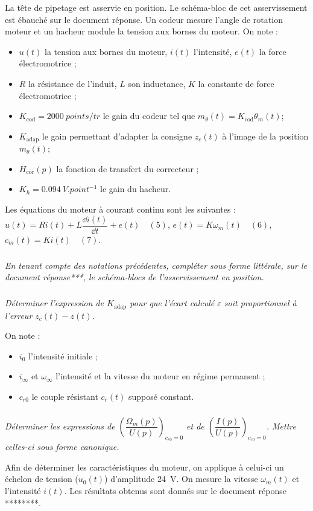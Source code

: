 \documentclass[10pt,fleqn]{article} %
\begin{document}
La tête de pipetage est asservie en position. Le schéma-bloc de cet asservissement est ébauché sur le
document réponse. Un codeur mesure l’angle de rotation moteur et un hacheur
module la tension aux bornes du moteur.
On note :
\begin{itemize}
\item $u(t)$ la tension aux bornes du moteur, $i(t)$ l’intensité, $e(t)$ la force électromotrice ;
\item $R$ la résistance de l’induit, $L$ son inductance, $K$ la constante de force électromotrice ;
\item $K_{\text{cod}} = \SI{2 000}{points/tr}$ le gain du codeur tel que $m_{\theta}(t) = K_{\text{cod}}\theta_m(t)$;
\item $K_\text{adap}$ le gain permettant d’adapter la consigne $z_c(t)$ à l’image de la position $m_{\theta}(t)$;
\item $H_{\text{cor}}(p)$ la fonction de transfert du correcteur ;
\item $K_h =\SI{0,094}{V.point^{-1}}$ le gain du hacheur.
\end{itemize}
Les équations du moteur à courant continu sont les suivantes :
$u(t) =Ri(t) + L\dfrac{\dd i(t)}{\dd t}+e(t) \quad (5)$, $e(t)=K\omega_m(t) \quad (6)$, $ c_m(t)=Ki(t)  \quad (7) $.

\subparagraph{}\textit{En tenant compte des notations précédentes, compléter sous forme littérale,
sur le document réponse***, le schéma-blocs de l’asservissement en position.}




\subparagraph{}\textit{Déterminer l’expression de $K_{\text{adap}}$ pour que l’écart calculé $\varepsilon$  soit proportionnel à l’erreur $z_c(t)-z(t)$.}

On note :
\begin{itemize}
\item $i_0$ l’intensité initiale ;
\item $i_{\infty}$ et $\omega_{\infty}$ l’intensité et la vitesse du moteur en régime permanent ;
\item $c_{r0}$ le couple résistant $c_{r}(t)$ supposé constant.
\end{itemize}

\subparagraph{\label{26}}\textit{Déterminer les expressions de $\left(\dfrac{\Omega_m(p)}{U(p)}\right)_{c_{r0}=0}$ et de $\left(\dfrac{I(p)}{U(p)}\right)_{c_{r0}=0}$. Mettre celles-ci
sous forme canonique.}

Afin de déterminer les caractéristiques du moteur, on applique à celui-ci un échelon de tension
($u_0(t)$) d’amplitude \SI{24}{V}. On mesure la vitesse $\omega_m(t)$ et l’intensité $i(t)$. Les résultats obtenus sont donnés sur le document réponse ********.
\end{document}
